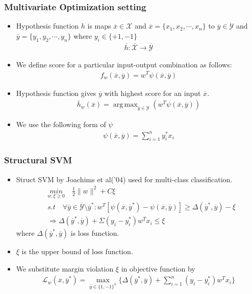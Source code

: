 \documentclass{beamer}
\DeclareMathOperator*{\argmax}{arg\,max}
\begin{document}
\begin{frame}
	\frametitle{Multivariate Optimization setting}
	\begin{itemize}
	\item Hypothesis function $h$ is maps $\overline{x}\in \mathcal{X}$ and $\overline{x}=\{x_1,x_2,\cdots,x_n\}$ to $\overline{y}\in\mathcal{Y}$ and $\overline{y}=\{y_1,y_2,\cdots,y_n\}$ where $y_i\in \{+1,-1\}$
	\begin{align*}
		\overline{h}:\overline{\mathcal{X}} \rightarrow \overline{\mathcal{Y}}
	\end{align*}
	\item We define score for a particular input-output combination as follows:
	\begin{align*}
		f_w(\overline{x},\overline{y}) = w^T\psi({\overline{x},\overline{y}})
	\end{align*}
	\item Hypothesis function gives $\overline{y}$ with highest score for an input $\overline{x}$.
	\begin{align*}
		\overline{h}_w(\overline{x})=\argmax_{\overline{y}\in\mathcal{Y}}(w^T\psi({\overline{x},\overline{y}}))
	\end{align*}
	\item We use the following form of $\psi$	
	\begin{align*}
		\psi(\overline{x},\overline{y}) = \sum_{i=1}^n y_i^*x_i
	\end{align*}
	\end{itemize}
\end{frame}


\begin{frame}
	\frametitle{Structural SVM}
	\begin{itemize}
	\item Struct SVM by Joachims et al('04) used for multi-class classification.
	\begin{equation*}
	\begin{split}
	& \underset{w,\xi \geq 0}{min} \quad \frac{1}{2}\|w\|^2+C\xi\\
	& s.t \quad \forall\overline{y} \in \overline{\mathcal{Y}}\setminus\overline{y}^*:w^T[\psi(\overline{x},\overline{y}^*)- \psi(\overline{x},\overline{y})]\geq \Delta(\overline{y}^*,\overline{y})-\xi\\
	& \Rightarrow \Delta(\overline{y}^*,\overline{y}) + \Sigma (y_i - y_i^*)w^Tx_i \leq \xi
	\end{split}
	\end{equation*}
	where $\Delta(\overline{y}^*,\overline{y})$ is loss function.	
	\item $\xi$ is the upper bound of loss function.
	\item We substitute margin violation $\xi$ in objective function by
	\begin{align}
	\label{eqn:1}
	\mathcal L_w(\overline{x},\overline{y}^*)=\max_{\overline{y}\in\{1,-1\}^n}\{\Delta(\overline{y}^*,\overline{y}) + \sum_{i=1}^n (y_i - y_i^*)w^Tx_i\}
	\end{align}
	\end{itemize}
\end{frame}
\end{document}
